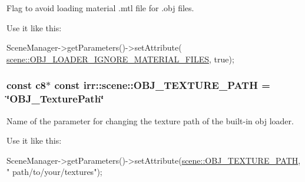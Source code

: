Flag to avoid loading material .mtl file for .obj files. 

Use it like this\+: 
\begin{DoxyCode}
SceneManager->getParameters()->setAttribute(
      \hyperlink{namespaceirr_1_1scene_ac7d5a31e2146062ddbde288115bb6c7b}{scene::OBJ\_LOADER\_IGNORE\_MATERIAL\_FILES}, \textcolor{keyword}{true});
\end{DoxyCode}
\subsubsection[{\texorpdfstring{O\+B\+J\+\_\+\+T\+E\+X\+T\+U\+R\+E\+\_\+\+P\+A\+TH}{OBJ\_TEXTURE\_PATH}}]{\setlength{\rightskip}{0pt plus 5cm}const {\bf c8}$\ast$ const irr\+::scene\+::\+O\+B\+J\+\_\+\+T\+E\+X\+T\+U\+R\+E\+\_\+\+P\+A\+TH = \char`\"{}O\+B\+J\+\_\+\+Texture\+Path\char`\"{}}\hypertarget{namespaceirr_1_1scene_a12d0b16f969fdaaf7c2161a0c7152b54}{}\label{namespaceirr_1_1scene_a12d0b16f969fdaaf7c2161a0c7152b54}


Name of the parameter for changing the texture path of the built-\/in obj loader. 

Use it like this\+: 
\begin{DoxyCode}
SceneManager->getParameters()->setAttribute(\hyperlink{namespaceirr_1_1scene_a12d0b16f969fdaaf7c2161a0c7152b54}{scene::OBJ\_TEXTURE\_PATH}, \textcolor{stringliteral}{"
      path/to/your/textures"});
\end{DoxyCode}
 